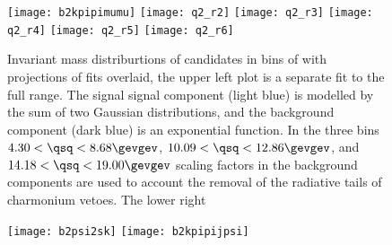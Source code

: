 \begin{figure}
  \begin{center}
    \texttt{[image: b2kpipimumu]}
    \texttt{[image: q2\_r2]}
    \texttt{[image: q2\_r3]}
    \texttt{[image: q2\_r4]}
    \texttt{[image: q2\_r5]}
    \texttt{[image: q2\_r6]}
    \caption{\small
      Invariant mass distriburtions of \btokpipimumu candidates in bins of \qsq with projections of
      fits overlaid, the upper left plot is a separate fit to the full \qsq range.
      The signal signal component (light blue) is modelled by the sum of two Gaussian
      distributions, and the background component (dark blue) is an exponential function.
      In the three \qsq bins $4.30<\qsq<8.68\gevgev$, $10.09<\qsq<12.86\gevgev$, and
      $14.18<\qsq<19.00\gevgev$ scaling factors in the background components are used to account
      the removal of the radiative tails of charmonium vetoes.
      The lower right
    }
    \label{}
  \end{center}
\end{figure}



\begin{figure}
  \begin{center}
    \texttt{[image: b2psi2sk]}
    \texttt{[image: b2kpipijpsi]}
    \caption{\small
    }
    \label{}
  \end{center}
\end{figure}



